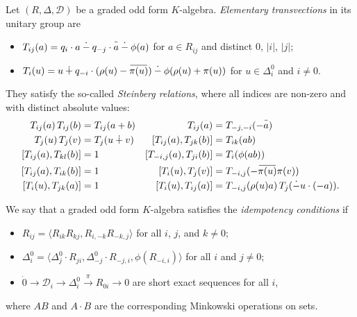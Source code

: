 \documentclass{article}
\theoremstyle{definition}
\newcommand{\dotminus}{\mathbin{\dot{-}}}
\newcommand{\inv}[1]{
    \!\;\overline{
        \!\!\:#1\vphantom !\!\!\:
    }\;\!
}
\begin{document}
Let \(
    (R, \Delta, \mathcal D)
\) be a graded odd form \(K\)-algebra. \textit{Elementary transvections} in its unitary group are
\begin{itemize}

    \item \(
        T_{ij}(a)
        =
        q_i \cdot a
        \dotminus q_{-j} \cdot \inv a
        \dotminus \phi(a)
    \) for \(a \in R_{ij}\) and distinct \(0\), \(|i|\), \(|j|\);

    \item \(
        T_i(u)
        =
        u
        \dotplus q_{-i} \cdot (\rho(u) - \inv{\pi(u)})
        \dotminus \phi(\rho(u) + \pi(u))
    \) for \(u \in \Delta^0_i\) and \(i \neq 0\).

\end{itemize}
They satisfy the so-called \textit{Steinberg relations}, where all indices are non-zero and with distinct absolute values:
\begin{align*}
    T_{ij}(a)\, T_{ij}(b) &= T_{ij}(a + b)
    &
    T_{ij}(a) &= T_{-j, -i}(-\inv a)
    \\
    T_j(u)\, T_j(v) &= T_j(u \dotplus v)
    &
    [T_{ij}(a), T_{jk}(b)] &= T_{ik}(ab)
    \\
    [T_{ij}(a), T_{kl}(b)] &= 1
    &
    [T_{-i, j}(a), T_{ji}(b)] &= T_i(\phi(ab))
    \\
    [T_{ij}(a), T_{ik}(b)] &= 1
    &
    [T_i(u), T_j(v)]
    &=
    T_{-i, j}(-\inv{\pi(u)} \pi(v))
    \\
    [T_i(u), T_{jk}(a)] &= 1
    &
    [T_i(u), T_{ij}(a)]
    &=
    T_{-i, j}(\rho(u) a)\,
    T_j(\dotminus u \cdot (-a)).
\end{align*}

We say that a graded odd form \(K\)-algebra satisfies the \textit{idempotency conditions} if
\begin{itemize}
    \item \(
        R_{ij} = \langle
            R_{ik} R_{kj},
            R_{i, -k} R_{-k, j}
        \rangle
    \) for all \(i\), \(j\), and \(k \neq 0\);
    \item \(
        \Delta^0_i = \langle
            \Delta^0_j \cdot R_{ji},
            \Delta^0_{-j} \cdot R_{-j, i},
            \phi(R_{-i, i})
        \rangle
    \) for all \(i\) and \(j \neq 0\);
    \item \(
        \dot 0
        \to \mathcal D_i
        \to \Delta^0_i
        \xrightarrow{\pi} R_{0i}
        \to 0
    \) are short exact sequences for all \(i\),
\end{itemize}
where \(AB\) and \(A \cdot B\) are the corresponding Minkowski operations on sets.
\end{document}
